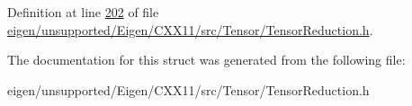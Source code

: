 Definition at line \hyperlink{eigen_2unsupported_2_eigen_2_c_x_x11_2src_2_tensor_2_tensor_reduction_8h_source_l00202}{202} of file \hyperlink{eigen_2unsupported_2_eigen_2_c_x_x11_2src_2_tensor_2_tensor_reduction_8h_source}{eigen/unsupported/\+Eigen/\+C\+X\+X11/src/\+Tensor/\+Tensor\+Reduction.\+h}.



The documentation for this struct was generated from the following file\+:\begin{DoxyCompactItemize}
\item 
eigen/unsupported/\+Eigen/\+C\+X\+X11/src/\+Tensor/\+Tensor\+Reduction.\+h\end{DoxyCompactItemize}
